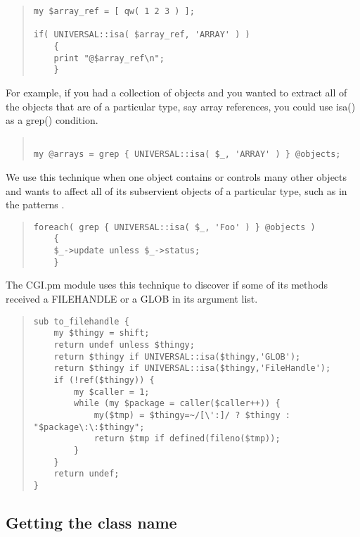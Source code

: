 \begin{quote}    
\begin{verbatim}
my $array_ref = [ qw( 1 2 3 ) ];

if( UNIVERSAL::isa( $array_ref, 'ARRAY' ) )
    {
    print "@$array_ref\n";
    }
\end{verbatim}
\end{quote}


For example, if you had a collection of objects and you wanted to extract
all of the objects that are of a particular type, say array references, you
could use isa() as a grep() condition.

\begin{quote}    
\begin{verbatim}

my @arrays = grep { UNIVERSAL::isa( $_, 'ARRAY' ) } @objects;

\end{verbatim}
\end{quote}

We use this technique when one object contains or controls many other
objects and wants to affect all of its subservient objects of a particular
type, such as in the patterns .

\begin{quote}    
\begin{verbatim}
foreach( grep { UNIVERSAL::isa( $_, 'Foo' ) } @objects )
    {
    $_->update unless $_->status;
    }
\end{verbatim}
\end{quote}

The CGI.pm module uses this technique to discover if some of its
methods received a FILEHANDLE or a GLOB in its argument list.

\begin{quote}    
\begin{verbatim}
sub to_filehandle {
    my $thingy = shift;
    return undef unless $thingy;  
    return $thingy if UNIVERSAL::isa($thingy,'GLOB');
    return $thingy if UNIVERSAL::isa($thingy,'FileHandle');
    if (!ref($thingy)) {  
        my $caller = 1;
        while (my $package = caller($caller++)) {
            my($tmp) = $thingy=~/[\':]/ ? $thingy : "$package\:\:$thingy";
            return $tmp if defined(fileno($tmp));
        }     
    }         
    return undef;
}
\end{verbatim}
\end{quote}

        \subsection{Getting the class name}

